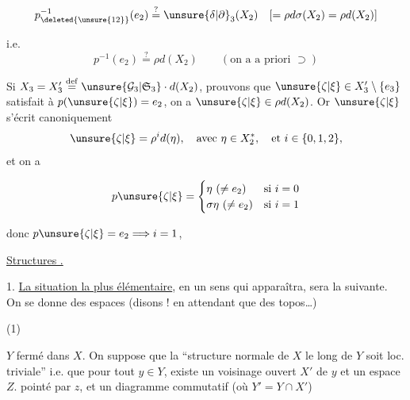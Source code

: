 \[
p_{\deleted{\unsure{12}}}^{-1}(e_2)\overset{?}=\unsure{\delta|\partial}_3(X_2)\quad[=\rho d\sigma(X_2)=\rho d(X_2)]
\]


 i.e.
\[
p^{-1}(e_2)\overset{?}=\rho d(X_2)\qquad(\text{on a a priori }\supset)
\]

Si $X_3=X'_3\overset{\mathrm{def}}=\unsure{\mathcal G_3|\mathfrak S_3}\cdot d(X_2)$,
  prouvons que   $\unsure{\zeta|\xi}\in X'_3\setminus\{e_3\}$ satisfait à $p(\unsure{\zeta|\xi})=e_2$, on a $\unsure{\zeta|\xi}\in\rho d(X_2)$. Or $\unsure{\zeta|\xi}$ s'écrit canoniquement
\[
\unsure{\zeta|\xi}=\rho^i d(\eta),\quad\text{avec }\eta\in X_2^*,\quad\text{et }i\in\{0,1,2\},
\]
et on a

\[
p\unsure{\zeta|\xi}=\begin{cases}
\eta\ (\ne e_2)&\text{si }i=0\\
\sigma\eta\ (\ne e_2)&\text{si }i=1
\end{cases}
\]


donc $p\unsure{\zeta|\xi}=e_2\Longrightarrow i=1$, 


\uline{Structures .}

1. \uline{La situation la plus élémentaire}, en un sens qui apparaîtra, sera la suivante. On se donne des espaces (disons !\unsure{)|\}} en attendant que   des topos\ldots)

(1)

$Y$ fermé dans $X$. On suppose que la ``structure normale de $X$ le long de $Y$ soit loc. triviale''\unsure{)|\}} i.e. que pour tout $y\in Y$, existe un voisinage ouvert $X'$ de $y$ et un espace $Z$. pointé par $z$, et un diagramme commutatif (où $Y'=Y\cap X'$)

